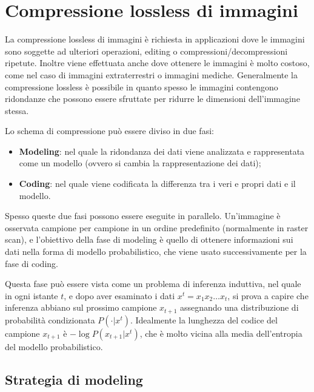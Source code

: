 \chapter{Compressione lossless di immagini}

La compressione lossless di immagini è richiesta in applicazioni dove le immagini sono soggette ad ulteriori operazioni, editing o compressioni/decompressioni ripetute. Inoltre viene effettuata anche dove ottenere le immagini è molto costoso, come nel caso di immagini extraterrestri o immagini mediche. Generalmente la compressione lossless è possibile in quanto spesso le immagini contengono ridondanze che possono essere sfruttate per ridurre le dimensioni dell'immagine stessa.

Lo schema di compressione può essere diviso in due fasi:

\begin{itemize}
    \item \textbf{Modeling}: nel quale la ridondanza dei dati viene analizzata e rappresentata come un modello (ovvero si cambia la rappresentazione dei dati);
    \item \textbf{Coding}: nel quale viene codificata la differenza tra i veri e propri dati e il modello.
\end{itemize}

\begin{figure}[htbp!]
  \centering
  
\end{figure}
\FloatBarrier

Spesso queste due fasi possono essere eseguite in parallelo. Un'immagine è osservata campione per campione in un ordine predefinito (normalmente in raster scan), e l'obiettivo della fase di modeling è quello di ottenere informazioni sui dati nella forma di modello probabilistico, che viene usato successivamente per la fase di coding.

Questa fase può essere vista come un problema di inferenza induttiva, nel quale in ogni istante \(t\), e dopo aver esaminato i dati \(x^t = x_1 x_2 \dots x_t\), si prova a capire che inferenza abbiano sul prossimo campione \(x_{t+1}\) assegnando una distribuzione di probabilità condizionata \(P(\cdot |x^t)\). Idealmente la lunghezza del codice del campione \(x_{t+1}\) è \(- \log P(x_{t+1}|x^t)\), che è molto vicina alla media dell'entropia del modello probabilistico.

\section{Strategia di modeling}

